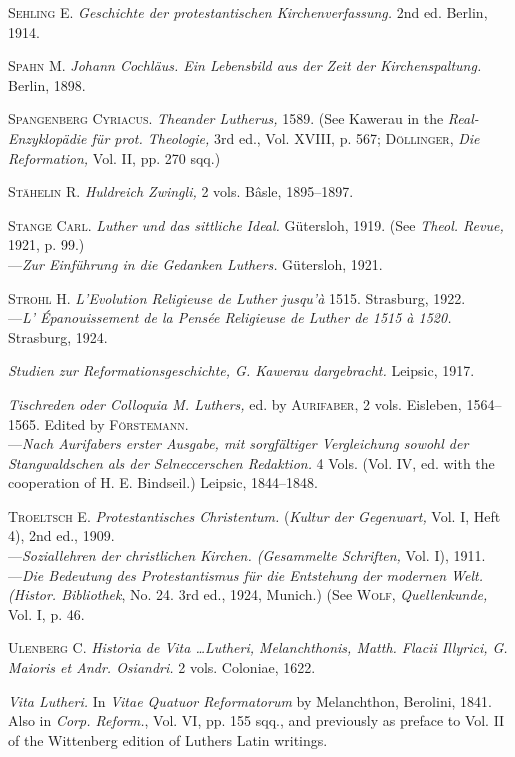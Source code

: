 \textsc{Sehling E.} \textit{Geschichte der protestantischen Kirchenverfassung.} 2nd ed.
Berlin, 1914.

\textsc{Spahn M.} \textit{Johann Cochläus. Ein Lebensbild aus der Zeit der Kirchenspaltung.}
Berlin, 1898.

\textsc{Spangenberg Cyriacus.} \textit{Theander Lutherus,} 1589. (See Kawerau in the
\textit{Real-Enzyklopädie für prot. Theologie,} 3rd ed., Vol. XVIII, p. 567; \textsc{Döllinger},
\textit{Die Reformation,} Vol. II, pp. 270 sqq.)

\textsc{Stähelin R.} \textit{Huldreich Zwingli,} 2 vols. Bâsle, 1895--1897.

\textsc{Stange Carl.} \textit{Luther und das sittliche Ideal.} Gütersloh, 1919. (See \textit{Theol.
Revue,} 1921, p. 99.) \\
---\textit{Zur Einführung in die Gedanken Luthers.} Gütersloh, 1921.

\textsc{Strohl H.} \textit{L’Evolution Religieuse de Luther jusqu'à} 1515. Strasburg,
1922. \\
---\textit{L’ Épanouissement de la Pensée Religieuse de Luther de 1515 à 1520.}
Strasburg, 1924.

\textit{Studien zur Reformationsgeschichte, G. Kawerau dargebracht.} Leipsic, 1917.

\textit{Tischreden oder Colloquia M. Luthers,} ed. by \textsc{Aurifaber,} 2 vols. Eisleben,
1564--1565. Edited by \textsc{Förstemann.} \\
---\textit{Nach Aurifabers erster Ausgabe, mit sorgfältiger Vergleichung sowohl
der Stangwaldschen als der Selneccerschen Redaktion.} 4 Vols. (Vol. IV, ed.
with the cooperation of H. E. Bindseil.) Leipsic, 1844--1848.

\textsc{Troeltsch E.} \textit{Protestantisches Christentum.} (\textit{Kultur der Gegenwart,} Vol.
I, Heft 4), 2nd ed., 1909. \\
---\textit{Soziallehren der christlichen Kirchen. (Gesammelte Schriften,} Vol. I),
1911. \\
---\textit{Die Bedeutung des Protestantismus für die Entstehung der modernen
Welt. (Histor. Bibliothek}, No. 24. 3rd ed., 1924, Munich.) (See \textsc{Wolf,}
\textit{Quellenkunde,} Vol. I, p. 46.

\textsc{Ulenberg C.} \textit{Historia de Vita \dots Lutheri, Melanchthonis, Matth. Flacii
Illyrici, G. Maioris et Andr. Osiandri.} 2 vols. Coloniae, 1622.

\textit{Vita Lutheri.} In \textit{Vitae Quatuor Reformatorum} by Melanchthon, Berolini,
1841. Also in \textit{Corp. Reform.}, Vol. VI, pp. 155 sqq., and previously as preface
to Vol. II of the Wittenberg edition of Luthers Latin writings.

